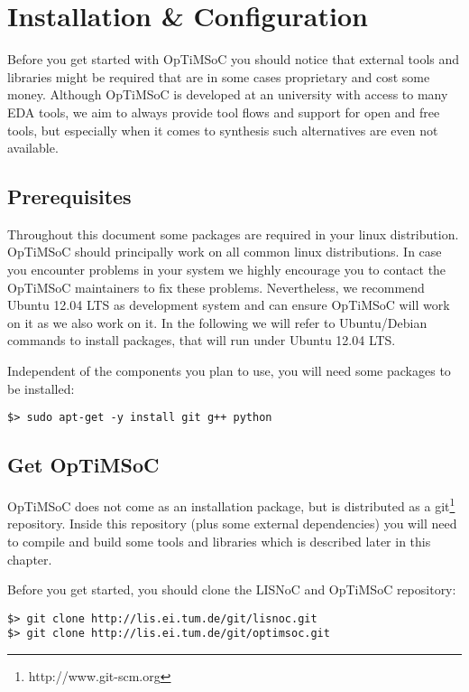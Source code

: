 \chapter{Installation \& Configuration}
\label{chap:installation}

Before you get started with OpTiMSoC you should notice that external
tools and libraries might be required that are in some cases
proprietary and cost some money. Although OpTiMSoC is developed at an
university with access to many EDA tools, we aim to always provide
tool flows and support for open and free tools, but especially when it
comes to synthesis such alternatives are even not available.

\section{Prerequisites}

Throughout this document some packages are required in your linux
distribution. OpTiMSoC should principally work on all common linux
distributions. In case you encounter problems in your system we highly
encourage you to contact the OpTiMSoC maintainers to fix these
problems. Nevertheless, we recommend Ubuntu 12.04 LTS as development
system and can ensure OpTiMSoC will work on it as we also work on it.
In the following we will refer to Ubuntu/Debian commands to install
packages, that will run under Ubuntu 12.04 LTS.

Independent of the components you plan to use, you will need some
packages to be installed:

\begin{verbatim}
$> sudo apt-get -y install git g++ python
\end{verbatim}

\section{Get OpTiMSoC}

OpTiMSoC does not come as an installation package, but is distributed
as a git\footnote{http://www.git-scm.org} repository. Inside this
repository (plus some external dependencies) you will need to compile
and build some tools and libraries which is described later in this
chapter.

Before you get started, you should clone the LISNoC and OpTiMSoC
repository:

\begin{verbatim}
$> git clone http://lis.ei.tum.de/git/lisnoc.git
$> git clone http://lis.ei.tum.de/git/optimsoc.git
\end{verbatim}

